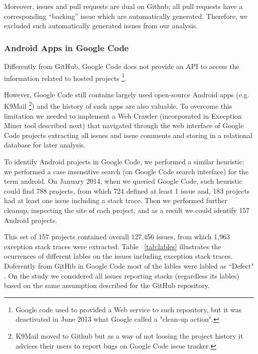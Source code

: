 \documentclass[conference]{IEEEtran}
\begin{document}
Moreover, issues and pull requests are dual on Github; all pull requests have a corresponding 
``backing'' issue which are automatically generated. Therefore, we excluded such automatically generated
issues from our analysis. 

\subsubsection{Android Apps in Google Code}

Differently from GitHub, Google Code does not provide an API to access the information related
 to hosted projects \footnote{Google code used to provided a Web service to such repository, but it was deactivated in June 2013 what Google called a "clean-up action".}.

However, Google Code still contains largely used open-source Android apps (e.g. K9Mail \footnote{K9Mail moved to Github but as a way of not loosing the project history 
it advices their users to report bugs on Google Code issue tracker.})  and the history of such apps are also valuable. 
To overcome this limitation we needed to implement a Web Crawler (incorporated in Exception Miner tool described next) that navigated 
through the web interface of Google Code projects extracting all issues and issue comments and storing in a relational database for later analysis.

To identify Android projects in Google Code, we performed a similar heuristic: we performed a case insensitive search 
(on Google Code search interface) for the term \textsf{android}.  On January 2014, when we queried Google Code, such heuristic could
 find 788  projects, from which 724 defined at least 1 issue and, 183 projects 
had at least one issue including a stack trace. Then we performed further cleanup, inspecting the site of each project,
 and as a result we could identify 157 Android projects.  

This set of 157 projects contained overall 127,456 issues, from which 1,963 exception stack traces 
were extracted. Table ~\ref{tab:lables} illustrates the ocurrences of different lables 
on the issues including exception stack traces. Doferently from GitHib in Google Code most of 
the lables were labled as ``Defect" . On the study we considered all issues reporting stacks (regardless its lables)
based on the same assumption described for the GitHub repository.


\end{document}
